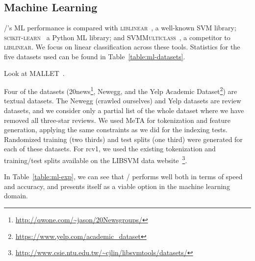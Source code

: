 





\subsection{Machine Learning}

\meta/'s ML performance is compared with \textsc{liblinear}~\cite{liblinear}, a
well-known SVM library; \textsc{scikit-learn}~\cite{scikit} a Python ML library;
and \textsc{SVMMulticlass}~\cite{svmmulticlass}, a competitor to
\textsc{liblinear}. We focus on linear classification across these tools.
Statistics for the five datasets used can be found in
Table~\ref{table:ml-datasets}.

Look at MALLET~\cite{mallet}.

Four of the datasets
(20news\footnote{\url{http://qwone.com/~jason/20Newsgroups/}}, Newegg, and the
Yelp Academic Dataset\footnote{\url{https://www.yelp.com/academic_dataset}}) are
textual datasets. The Newegg (crawled ourselves) and Yelp datasets are review
datasets, and we consider only a partial list of the whole dataset where we have
removed all three-star reviews. We used MeTA for tokenization and feature
generation, applying the same constraints as we did for the indexing tests.
Randomized training (two thirds) and test splits (one third) were generated for
each of these datasets. For rcv1, we used the existing tokenization and
training/test splits available on the LIBSVM data
website~\footnote{\url{http://www.csie.ntu.edu.tw/~cjlin/libsvmtools/datasets/}}.

In Table~\ref{table:ml-exp}, we can see that \meta/ performs well both in
terms of speed and accuracy, and presents itself as a viable option in the
machine learning domain.



